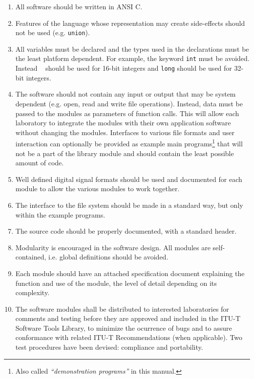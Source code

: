 \begin{enumerate}
\item All software should be written in ANSI C.

\item Features of the language whose representation may create
      side-effects should not be used (e.g. {\tt union}).

\item All variables must be declared and the types used in the
      declarations must be the least platform dependent. For example,
      the keyword {\tt int} must be avoided. Instead \short~ should be
      used for 16-bit integers and {\tt long} should be used for
      32-bit integers.

\item The software should not contain any input or output that may be
      system dependent (e.g. open, read and write file operations).
      Instead, data must be passed to the modules as parameters of
      function calls. This will allow each laboratory to integrate the
      modules with their own application software without changing the
      modules.  Interfaces to various file formats and user
      interaction can optionally be provided as example main
      programs\footnote{\SF Also called {\em ``demonstration
      programs''} in this manual.} that will not be a part of the
      library module and should contain the least possible amount of
      code.

\item Well defined digital signal formats should be used and
      documented for each module to allow the various modules to work
      together.

\item The interface to the file system should be made in a standard way,
      but only within the example programs.

\item The source code should be properly documented, with a standard
      header.

\item Modularity is encouraged in the software design. All modules
      are self-contained, i.e. global definitions should be avoided.

\item Each module should have an attached specification document
      explaining the function and use of the module, the level of
      detail depending on its complexity.

\item The software modules shall be distributed to interested
      laboratories for comments and testing before they are approved
      and included in the ITU-T Software Tools Library, to minimize
      the ocurrence of bugs and to assure conformance with related
      ITU-T Recommendations (when applicable). Two test procedures
      have been devised: compliance and portability.
\end{enumerate}
\def\labelenumi{\arabic{enumi}.}
\def\theenumi{\arabic{enumi}}

